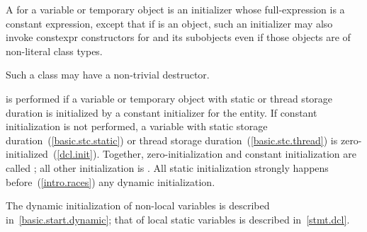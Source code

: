 \pnum
{}%
%
A  for a variable or temporary object 
is an initializer whose full-expression is a
constant expression, except that if  is an object,
such an initializer may also invoke constexpr constructors
for  and its subobjects even if those objects are of non-literal class
types. \begin{note} Such a class may have a non-trivial destructor. \end{note}
 is performed
if a variable or temporary object with static or thread storage duration
is initialized by a constant initializer for the entity.
%
If constant initialization is not performed, a variable with static
storage duration~(\ref{basic.stc.static}) or thread storage
duration~(\ref{basic.stc.thread}) is zero-initialized~(\ref{dcl.init}).
Together, zero-initialization and constant initialization are called
%
;
all other initialization is .
All static initialization strongly happens before~(\ref{intro.races})
any dynamic initialization.
\begin{note} The dynamic initialization of non-local variables is described
in~\ref{basic.start.dynamic}; that of local static variables is described
in~\ref{stmt.dcl}. \end{note}

